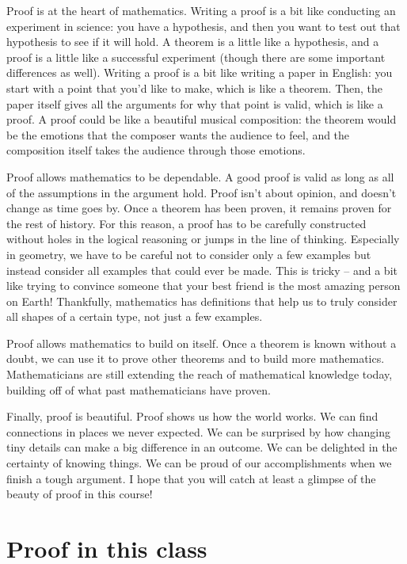 \documentclass{ximera}
\begin{document}
Proof is at the heart of mathematics. Writing a proof is a bit like conducting an experiment in science: you have a hypothesis, and then you want to test out that hypothesis to see if it will hold. A theorem is a little like a hypothesis, and a proof is a little like a successful experiment (though there are some important differences as well). Writing a proof is a bit like writing a paper in English: you start with a point that you'd like to make, which is like a theorem. Then, the paper itself gives all the arguments for why that point is valid, which is like a proof. A proof could be like a beautiful musical composition: the theorem would be the emotions that the composer wants the audience to feel, and the composition itself takes the audience through those emotions.

 Proof allows mathematics to be dependable. A good proof is valid as long as all of the assumptions in the argument hold. Proof isn't about opinion, and doesn't change as time goes by. Once a theorem has been proven, it remains proven for the rest of history. For this reason, a proof has to be carefully constructed without holes in the logical reasoning or jumps in the line of thinking. Especially in geometry, we have to be careful not to consider only a few examples but instead consider all examples that could ever be made. This is tricky -- and a bit like trying to convince someone that your best friend is the most amazing person on Earth! Thankfully, mathematics has definitions that help us to truly consider all shapes of a certain type, not just a few examples.
 
 Proof allows mathematics to build on itself. Once a theorem is known without a doubt, we can use it to prove other theorems and to build more mathematics. Mathematicians are still extending the reach of mathematical knowledge today, building off of what past mathematicians have proven.
 
 Finally, proof is beautiful. Proof shows us how the world works. We can find connections in places we never expected. We can be surprised by how changing tiny details can make a big difference in an outcome. We can be delighted in the certainty of knowing things. We can be proud of our accomplishments when we finish a tough argument. I hope that you will catch at least a glimpse of the beauty of proof in this course!


\section{Proof in this class}
\end{document}
